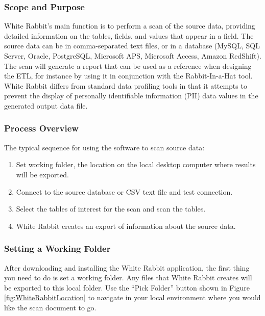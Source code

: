 \documentclass[11pt]{book}
\providecommand{\tightlist}{%
  \setlength{\itemsep}{0pt}\setlength{\parskip}{0pt}}
\theoremstyle{definition}
\theoremstyle{definition}
\theoremstyle{definition}
\theoremstyle{remark}
\begin{document}
\subsubsection*{Scope and Purpose}\label{scope-and-purpose}

White Rabbit's main function is to perform a scan of the source data,
providing detailed information on the tables, fields, and values that
appear in a field. The source data can be in comma-separated text files,
or in a database (MySQL, SQL Server, Oracle, PostgreSQL, Microsoft APS,
Microsoft Access, Amazon RedShift). The scan will generate a report that
can be used as a reference when designing the ETL, for instance by using
it in conjunction with the Rabbit-In-a-Hat tool. White Rabbit differs
from standard data profiling tools in that it attempts to prevent the
display of personally identifiable information (PII) data values in the
generated output data file.

\subsubsection*{Process Overview}\label{process-overview}

The typical sequence for using the software to scan source data:

\begin{enumerate}
\def\labelenumi{\arabic{enumi}.}
\tightlist
\item
  Set working folder, the location on the local desktop computer where
  results will be exported.
\item
  Connect to the source database or CSV text file and test connection.
\item
  Select the tables of interest for the scan and scan the tables.
\item
  White Rabbit creates an export of information about the source data.
\end{enumerate}

\subsubsection*{Setting a Working
Folder}\label{setting-a-working-folder}

After downloading and installing the White Rabbit application, the first
thing you need to do is set a working folder. Any files that White
Rabbit creates will be exported to this local folder. Use the ``Pick
Folder'' button shown in Figure \ref{fig:WhiteRabbitLocation} to
navigate in your local environment where you would like the scan
document to go.
\end{document}
